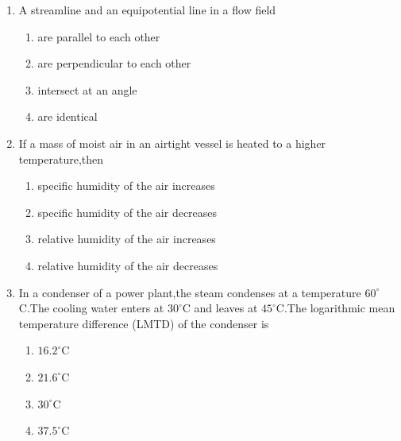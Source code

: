 \documentclass[journal]{IEEEtran}
\begin{document}
    \begin{enumerate}
        \item A streamline and an equipotential line in a flow field
    
    \begin{multicols}{2}
    
    
    \begin{enumerate}
    
        \item are parallel to each other
        \item are perpendicular to each other
        \item intersect at an angle
        \item are identical
    \end{enumerate}
    \end{multicols}
     \item If a mass of moist air in an airtight vessel is heated to a higher temperature,then
         \begin{multicols}{2}

    \begin{enumerate}
        \item specific humidity of the air increases
        \item specific humidity of the air decreases
        \item relative humidity of the air increases
        \item relative humidity of the air decreases

    \end{enumerate}
        \end{multicols}

    \item In a condenser of a power plant,the steam condenses at a temperature $60^{\circ}$C.The cooling water enters at $30^{\circ}$C and leaves at $45^{\circ}$C.The logarithmic mean temperature difference (LMTD) of the condenser is
        \begin{multicols}{2}

    \begin{enumerate}
        \item $16.2^{\circ}$C
        \item $21.6^{\circ}$C
        \item $30^{\circ}$C
        \item $37.5^{\circ}$C

        
        \end{enumerate}
            \end{multicols}


\end{enumerate}
\end{document}
